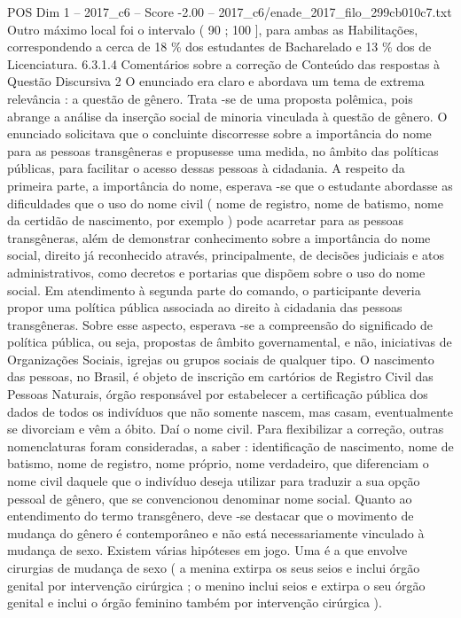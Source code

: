 \begin{textsample}{POS Dim 1 – 2017\_c6 – Score -2.00 – 2017\_c6/enade\_2017\_filo\_299cb010c7.txt}
Outro máximo local foi o intervalo ( 90 ; 100 ], para ambas as Habilitações, correspondendo a cerca de 18 \% dos estudantes de Bacharelado e 13 \% dos de Licenciatura. 6.3.1.4 Comentários sobre a correção de Conteúdo das respostas à Questão Discursiva 2 O enunciado era claro e abordava um tema de extrema relevância : a questão de gênero.
Trata -se de uma proposta polêmica, pois abrange a análise da inserção social de minoria vinculada à questão de gênero.
O enunciado solicitava que o concluinte discorresse sobre a importância do nome para as pessoas transgêneras e propusesse uma medida, no âmbito das políticas públicas, para facilitar o acesso dessas pessoas à cidadania.
A respeito da primeira parte, a importância do nome, esperava -se que o estudante abordasse as dificuldades que o uso do nome civil ( nome de registro, nome de batismo, nome da certidão de nascimento, por exemplo ) pode acarretar para as pessoas transgêneras, além de demonstrar conhecimento sobre a importância do nome social, direito já reconhecido através, principalmente, de decisões judiciais e atos administrativos, como decretos e portarias que dispõem sobre o uso do nome social.
Em atendimento à segunda parte do comando, o participante deveria propor uma política pública associada ao direito à cidadania das pessoas transgêneras.
Sobre esse aspecto, esperava -se a compreensão do significado de política pública, ou seja, propostas de âmbito governamental, e não, iniciativas de Organizações Sociais, igrejas ou grupos sociais de qualquer tipo.
O nascimento das pessoas, no Brasil, é objeto de inscrição em cartórios de Registro Civil das Pessoas Naturais, órgão responsável por estabelecer a certificação pública dos dados de todos os indivíduos que não somente nascem, mas casam, eventualmente se divorciam e vêm a óbito.
Daí o nome civil.
Para flexibilizar a correção, outras nomenclaturas foram consideradas, a saber : identificação de nascimento, nome de batismo, nome de registro, nome próprio, nome verdadeiro, que diferenciam o nome civil daquele que o indivíduo deseja utilizar para traduzir a sua opção pessoal de gênero, que se convencionou denominar nome social.
Quanto ao entendimento do termo transgênero, deve -se destacar que o movimento de mudança do gênero é contemporâneo e não está necessariamente vinculado à mudança de sexo.
Existem várias hipóteses em jogo.
Uma é a que envolve cirurgias de mudança de sexo ( a menina extirpa os seus seios e inclui órgão genital por intervenção cirúrgica ; o menino inclui seios e extirpa o seu órgão genital e inclui o órgão feminino também por intervenção cirúrgica ).

\end{textsample}
